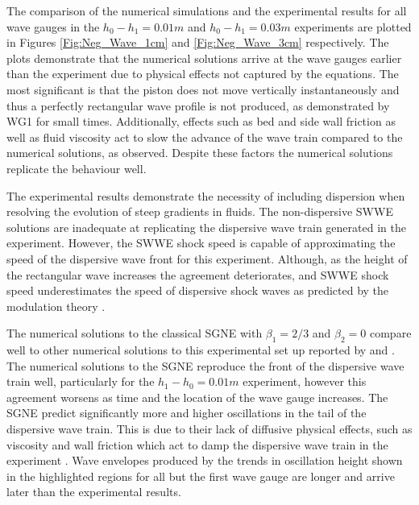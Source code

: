 \documentclass[10pt]{elsarticle}
\begin{document}

The comparison of the numerical simulations and the experimental results for all wave gauges in the $h_0 - h_1 = 0.01m$ and $h_0 - h_1 = 0.03m$ experiments are plotted in Figures \ref{Fig:Neg_Wave_1cm} and \ref{Fig:Neg_Wave_3cm} respectively. The plots demonstrate that the numerical solutions arrive at the wave gauges earlier than the experiment due to physical effects not captured by the equations. The most significant is that the piston does not move vertically instantaneously and thus a perfectly rectangular wave profile is not produced, as demonstrated by WG1 for small times.  Additionally, effects such as bed and side wall friction as well as fluid viscosity act to slow the advance of the wave train compared to the numerical solutions, as observed. Despite these factors the numerical solutions replicate the behaviour well.

The experimental results demonstrate the necessity of including dispersion when resolving the evolution of steep gradients in fluids. The non-dispersive SWWE solutions are inadequate at replicating the dispersive wave train generated in the experiment. However, the SWWE shock speed is capable of approximating the speed of the dispersive wave front for this experiment. Although, as the height of the rectangular wave increases the agreement deteriorates, and SWWE shock speed underestimates the speed of dispersive shock waves \cite{Pitt-2018-61} as predicted by the modulation theory \cite{El-etal-2006}.

The numerical solutions to the classical SGNE with $\beta_1 = 2/3$ and $\beta_2 = 0$ compare well to other numerical solutions to this experimental set up reported by \citet{Zoppou-etal-2017} and \citet{Pitt-2019}. The numerical solutions to the SGNE reproduce the front of the dispersive wave train well, particularly for the $h_1 - h_0 = 0.01m$ experiment, however this agreement worsens as time and the location of the wave gauge increases. The SGNE predict significantly more and higher oscillations in the tail of the dispersive wave train. This is due to their lack of diffusive physical effects, such as viscosity and wall friction which act to damp the dispersive wave train in the experiment \cite{Pitt-2018-61}. Wave envelopes produced by the trends in oscillation height shown in the highlighted regions for all but the first wave gauge are longer and arrive later than the experimental results.
\end{document}
